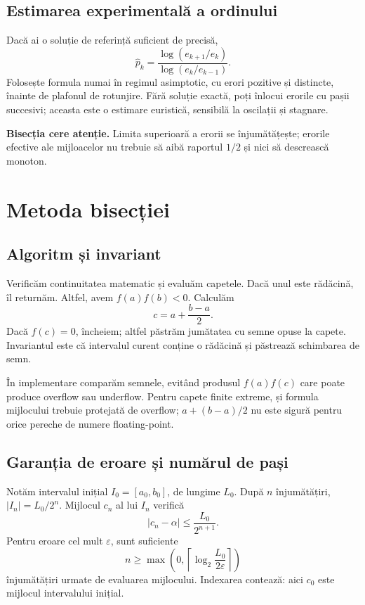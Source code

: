 \documentclass[11pt,a4paper]{article}
\begin{document}
\subsection{Estimarea experimentală a ordinului}
Dacă ai o soluție de referință suficient de precisă,
\[
\widehat p_k=\frac{\log(e_{k+1}/e_k)}{\log(e_k/e_{k-1})}.
\]
Folosește formula numai în regimul asimptotic, cu erori pozitive și distincte, înainte de plafonul de rotunjire. Fără soluție exactă, poți înlocui erorile cu pașii succesivi; aceasta este o estimare euristică, sensibilă la oscilații și stagnare.

\textbf{Bisecția cere atenție.} Limita superioară a erorii se înjumătățește; erorile efective ale mijloacelor nu trebuie să aibă raportul $1/2$ și nici să descrească monoton.

\section{Metoda bisecției}
\subsection{Algoritm și invariant}
Verificăm continuitatea matematic și evaluăm capetele. Dacă unul este rădăcină, îl returnăm. Altfel, avem $f(a)f(b)<0$. Calculăm
\[
c=a+\frac{b-a}{2}.
\]
Dacă $f(c)=0$, încheiem; altfel păstrăm jumătatea cu semne opuse la capete. Invariantul este că intervalul curent conține o rădăcină și păstrează schimbarea de semn.

În implementare comparăm semnele, evitând produsul $f(a)f(c)$ care poate produce overflow sau underflow. Pentru capete finite extreme, și formula mijlocului trebuie protejată de overflow; $a+(b-a)/2$ nu este sigură pentru orice pereche de numere floating-point.

\subsection{Garanția de eroare și numărul de pași}
Notăm intervalul inițial $I_0=[a_0,b_0]$, de lungime $L_0$. După $n$ înjumătățiri, $|I_n|=L_0/2^n$. Mijlocul $c_n$ al lui $I_n$ verifică
\[
|c_n-\alpha|\le\frac{L_0}{2^{n+1}}.
\]
Pentru eroare cel mult $\varepsilon$, sunt suficiente
\[
n\ge\max\!\left(0,\left\lceil\log_2\frac{L_0}{2\varepsilon}\right\rceil\right)
\]
înjumătățiri urmate de evaluarea mijlocului. Indexarea contează: aici $c_0$ este mijlocul intervalului inițial.
\end{document}
